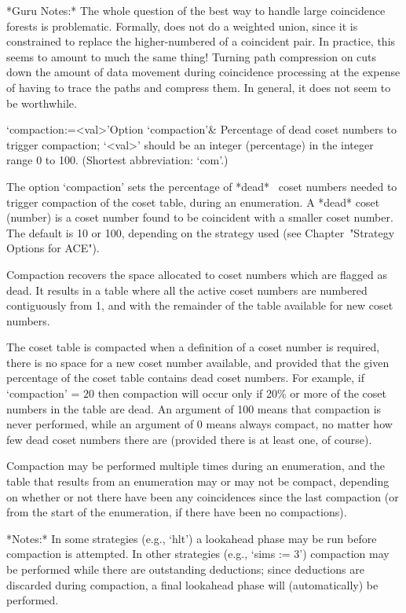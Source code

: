*Guru Notes:*
The whole question of the best way to handle large coincidence forests
is problematic.  Formally, {\ACE} does  not do a weighted union, since
it is constrained to replace the higher-numbered of a coincident pair.
In practice,  this seems  to amount to  much the same  thing!  Turning
path  compression on  cuts down  the  amount of  data movement  during
coincidence processing at the expense of having to trace the paths and
compress them.  In general, it does not seem to be worthwhile.

\>`compaction:=<val>'{Option `compaction'}&
Percentage of dead coset numbers to trigger
compaction; `<val>' should be an integer (percentage) in  the  integer
range 0 to 100. (Shortest abbreviation: `com'.)

The option `compaction'  sets  the  percentage  of  *dead*~ coset numbers needed  to  trigger  compaction  of  the
coset table, during an enumeration. A *dead* coset (number) is a coset
number found to be coincident with a smaller coset number.  The
default  is  10  or  100,  depending  on  the   strategy   used   (see
Chapter~"Strategy Options for ACE").

Compaction recovers the space allocated to  coset  numbers  which  are
flagged as dead. It results in a table  where  all  the  active  coset
numbers are numbered contiguously from 1, and with  the  remainder  of
the table available for new coset numbers.

The coset table is compacted when a definition of a  coset  number  is
required, there is no space for a  new  coset  number  available,  and
provided that the given percentage of the coset  table  contains  dead
coset numbers. For example, if `compaction'  =  $20$  then  compaction
will occur only if 20\% or more of the coset numbers in the table  are
dead. An argument of 100 means that  compaction  is  never  performed,
while an argument of 0 means always compact, no matter  how  few  dead
coset numbers there are (provided there is at least one, of course).

Compaction may be performed  multiple times during an enumeration, and
the table that results from an  enumeration may or may not be compact,
depending on whether or not there have been any coincidences since the
last compaction (or  from the start of the  enumeration, if there have
been no compactions).

*Notes:*
In some strategies (e.g., `hlt') a lookahead phase may be  run  before
compaction is attempted. In  other  strategies  (e.g.,  `sims  :=  3')
compaction may be performed while there  are  outstanding  deductions;
since deductions are discarded during compaction,  a  final  lookahead
phase will (automatically) be performed.

